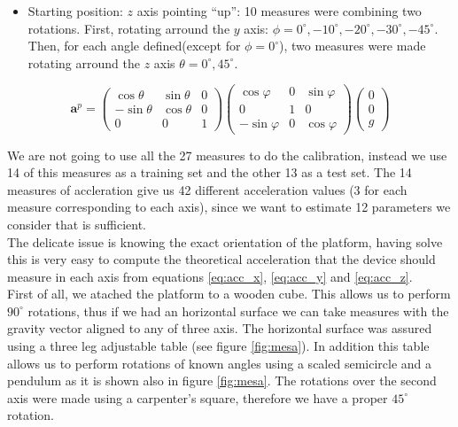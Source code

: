 \documentclass[conference]{IEEEtran}
\begin{document}
\begin{itemize}
\item Starting position: $z$ axis pointing ``up'': 10 measures were combining two rotations. First, rotating arround the $y$ axis: $\phi =0^\circ, -10^\circ, -20^\circ, -30^\circ, -45^\circ$. Then, for each angle defined(except for $\phi = 0^\circ$), two measures were made rotating arround the $z$ axis $\theta = 0^\circ, 45^\circ$.   \end{itemize}

\begin{scriptsize}
\begin{equation}
\mathbf{a}^p = \left(\begin{array}{ccc}
\cos \theta & \sin \theta & 0\\
-\sin \theta & \cos \theta & 0\\
0 & 0 & 1
\end{array}\right)\left(\begin{array}{ccc}
\cos \varphi & 0 &\sin \varphi\\
0 & 1 & 0\\
-\sin \varphi & 0 & \cos \varphi
\end{array}\right)\left(\begin{array}{c}
0\\
0\\
g
\end{array}\right)
\label{eq:acc_z}
\end{equation}
\end{scriptsize}

We are not going to use all the 27 measures to do the calibration, instead we use 14 of this measures as a training set and the other 13 as a test set. The 14 measures of accleration give us 42 different acceleration values (3 for each measure corresponding to each axis), since we want to estimate 12 parameters we consider that is sufficient.\\

The delicate issue is knowing the exact orientation of the platform, having solve this is very easy to compute the theoretical acceleration that the device should measure in each axis from equations \ref{eq:acc_x}, \ref{eq:acc_y} and \ref{eq:acc_z}.\\

First of all, we atached the platform to a wooden cube. This allows us to perform $90^\circ$ rotations, thus if we had an horizontal surface we can take measures with the gravity vector aligned to any of three axis. The horizontal surface was assured using a three leg adjustable table (see figure \ref{fig:mesa}). In addition this table allows us to perform rotations of known angles using a scaled semicircle and a pendulum as it is shown also in figure \ref{fig:mesa}. The rotations over the second axis were made using a carpenter's square, therefore we have a proper $45^\circ$ rotation.\\
\end{document}
